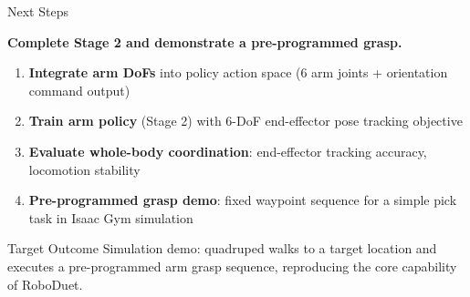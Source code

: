 \documentclass{beamer}
\newcommand{\takeaway}[1]{\begin{center}\large\bfseries #1\end{center}\vspace{-0.3em}}
\newcommand{\smallgap}{\vspace{0.5em}}
\begin{document}
\begin{frame}{Next Steps}
\takeaway{Complete Stage 2 and demonstrate a pre-programmed grasp.}

\begin{enumerate}
  \item \textbf{Integrate arm DoFs} into policy action space
        (6 arm joints + orientation command output)
  \item \textbf{Train arm policy} (Stage 2) with
        6-DoF end-effector pose tracking objective
  \item \textbf{Evaluate whole-body coordination}:
        end-effector tracking accuracy, locomotion stability
  \item \textbf{Pre-programmed grasp demo}:
        fixed waypoint sequence for a simple pick task
        in Isaac Gym simulation
\end{enumerate}

\smallgap
\begin{alertblock}{Target Outcome}
\small
Simulation demo: quadruped walks to a target location
and executes a pre-programmed arm grasp sequence,
reproducing the core capability of RoboDuet.
\end{alertblock}
\end{frame}

\backmatter
\end{document}
